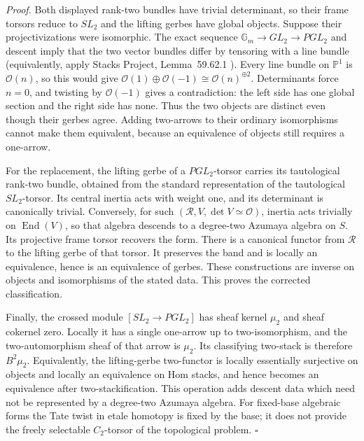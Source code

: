 \emph{Proof.} Both displayed rank-two bundles have trivial determinant, so their frame torsors reduce to $SL_2$ and the lifting gerbes have global objects. Suppose their projectivizations were isomorphic. The exact sequence $\mathbb G_m\to GL_2\to PGL_2$ and descent imply that the two vector bundles differ by tensoring with a line bundle (equivalently, apply Stacks Project, Lemma~59.62.1 \cite{StacksAzumaya}). Every line bundle on $\mathbb P^1$ is $\mathcal O(n)$, so this would give $\mathcal O(1)\oplus\mathcal O(-1)\cong\mathcal O(n)^{\oplus2}$. Determinants force $n=0$, and twisting by $\mathcal O(-1)$ gives a contradiction: the left side has one global section and the right side has none. Thus the two objects are distinct even though their gerbes agree. Adding two-arrows to their ordinary isomorphisms cannot make them equivalent, because an equivalence of objects still requires a one-arrow.

For the replacement, the lifting gerbe of a $PGL_2$-torsor carries its tautological rank-two bundle, obtained from the standard representation of the tautological $SL_2$-torsor. Its central inertia acts with weight one, and its determinant is canonically trivial. Conversely, for such $(\mathcal R,V,\det V\simeq\mathcal O)$, inertia acts trivially on $\operatorname{End}(V)$, so that algebra descends to a degree-two Azumaya algebra on $S$. Its projective frame torsor recovers the form. There is a canonical functor from $\mathcal R$ to the lifting gerbe of that torsor. It preserves the band and is locally an equivalence, hence is an equivalence of gerbes. These constructions are inverse on objects and isomorphisms of the stated data. This proves the corrected classification.

Finally, the crossed module $[SL_2\to PGL_2]$ has sheaf kernel $\mu_2$ and sheaf cokernel zero. Locally it has a single one-arrow up to two-isomorphism, and the two-automorphism sheaf of that arrow is $\mu_2$. Its classifying two-stack is therefore $B^2\mu_2$. Equivalently, the lifting-gerbe two-functor is locally essentially surjective on objects and locally an equivalence on Hom stacks, and hence becomes an equivalence after two-stackification. This operation adds descent data which need not be represented by a degree-two Azumaya algebra. For fixed-base algebraic forms the Tate twist in etale homotopy is fixed by the base; it does not provide the freely selectable $C_2$-torsor of the topological problem. \hfill$\square$

